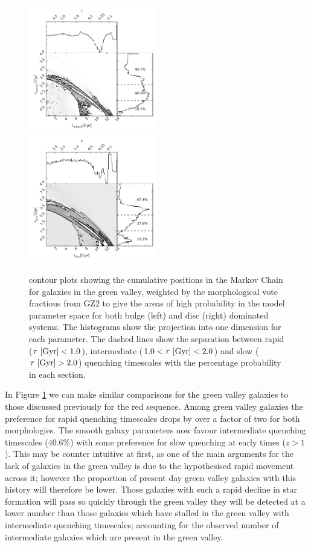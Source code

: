 \documentclass[useAMS,usenatbib]{mn2e}
\def\changed    {\color{titlecol} }
\begin{document}
\begin{figure}
\includegraphics[width=0.4975\textwidth]{green_smooth.pdf}
\includegraphics[width=0.4975\textwidth]{green_disc.pdf}
\caption[8pt]{{\changed contour plots showing the cumulative positions in the Markov Chain for galaxies in the green valley, weighted by the morphological vote fractious from GZ2 to give the areas of high probability in the model parameter space for both bulge (left) and disc (right) dominated systems. The histograms show the projection into one dimension for each parameter. The dashed lines show the separation between rapid ($\tau ~\rm{[Gyr]} < 1.0$), intermediate ($1.0 < \tau ~\rm{[Gyr]} < 2.0$) and slow ($\tau ~\rm{[Gyr]} > 2.0$) quenching timescales with the percentage probability in each section.}}
\label{green_v}
\end{figure}

In Figure \ref{green_v} we can make similar comparisons for the green valley galaxies to those discussed previously for the red sequence. {\changed Among green valley galaxies the preference for rapid quenching timescales drops by over a factor of two for both morphologies. The smooth galaxy parameters now favour intermediate quenching timescales ($40.6\%$) with some preference for slow quenching at  early times ($z > 1$).} This may be counter intuitive at first, as one of the main arguments for the lack of galaxies in the green valley is due to the hypothesised rapid movement across it; however the proportion of present day green valley galaxies with this history will therefore be lower. {\changed Those galaxies with such a rapid decline in star formation will pass so quickly through the green valley they will be detected at a lower number than those galaxies which have stalled in the green valley with intermediate quenching timescales;} accounting for the observed number of intermediate galaxies which are present in the green valley.
\end{document}

